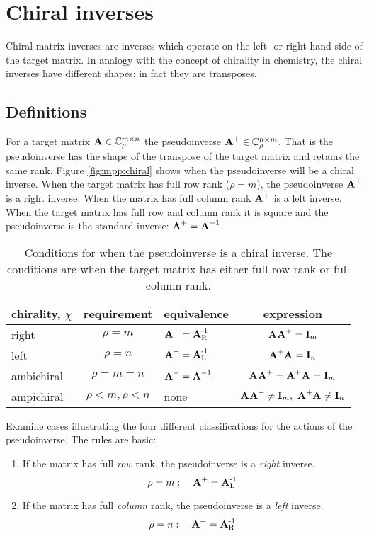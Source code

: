 \section{Chiral inverses}
\label{sec:chiral}
Chiral matrix inverses are inverses which operate on the left- or right-hand side of the target matrix. In analogy with the concept of chirality in chemistry, the chiral inverses have different shapes; in fact they are transposes.

\subsection{Definitions}
For a target matrix $\textbf{A}^{\mathrm{}}\in\mathbb{C}^{m \times n}_{\rho}$ the pseudoinverse $\operatorname{\textbf{A}^{\mathrm{+}}}\in\mathbb{C}^{n \times m}_{\rho}$. That is the pseudoinverse has the shape of the transpose of the target matrix and retains the same rank. Figure \eqref{fig:mpp:chiral} shows when the pseudoinverse will be a chiral inverse. When the target matrix has full row rank ($\rho=m$), the pseudoinverse $\operatorname{\textbf{A}^{\mathrm{+}}}$ is a right inverse. When the matrix has full column rank $\operatorname{\textbf{A}^{\mathrm{+}}}$ is a left inverse. When the target matrix has full row and column rank it is square and the pseudoinverse is the standard inverse: $\operatorname{\textbf{A}^{\mathrm{+}}}=\textbf{A}^{\mathrm{-1}}$.

\begin{table}[htdp]
\begin{center}
\begin{tabular}{lclc}
chirality, $\chi$ & requirement & equivalence & expression\\\hline
right & $\rho = m$ & $\operatorname{\textbf{A}^{\mathrm{+}}}=\operatorname{\textbf{A}^{\mathrm{-1}}_{\mathrm{R}}}$ & $\operatorname{\textbf{A}^{\mathrm{}}\textbf{A}^{\mathrm{+}}}=\textbf{I}_{m}$\\\hline
left  & $\rho = n$ & $\operatorname{\textbf{A}^{\mathrm{+}}}=\operatorname{\textbf{A}^{\mathrm{-1}}_{\mathrm{L}}}$ & $\operatorname{\textbf{A}^{\mathrm{+}}\textbf{A}^{\mathrm{}}}=\textbf{I}_{n}$\\\hline
ambichiral & $\rho=m=n$ & $\operatorname{\textbf{A}^{\mathrm{+}}}=\textbf{A}^{\mathrm{-1}}$ & $\operatorname{\textbf{A}^{\mathrm{}}\textbf{A}^{\mathrm{+}}}=\operatorname{\textbf{A}^{\mathrm{+}}\textbf{A}^{\mathrm{}}}=\textbf{I}_{m}$\\\hline
ampichiral & $\rho< m,\rho< n$ & \quad none & $\operatorname{\textbf{A}^{\mathrm{}}\textbf{A}^{\mathrm{+}}}\ne\textbf{I}_{m},\ \operatorname{\textbf{A}^{\mathrm{+}}\textbf{A}^{\mathrm{}}}\ne\textbf{I}_{n}$\\\hline
\end{tabular}
\end{center}
\label{fig:mpp:chiral}
\caption{Conditions for when the pseudoinverse is a chiral inverse. The conditions are when the target matrix has either full row rank or full column rank.}
\end{table}%

Examine cases illustrating the four different classifications for the actions of the pseudoinverse. The rules are basic:
\begin{enumerate}
\item If the matrix has full \textit{row} rank, the pseudoinverse is a \textit{right} inverse.
\begin{equation}
  \rho = m: \quad \operatorname{\textbf{A}^{\mathrm{+}}} = \operatorname{\textbf{A}^{\mathrm{-1}}_{\mathrm{L}}}
\end{equation}
\item If the matrix has full \textit{column} rank, the pseudoinverse is a \textit{left} inverse.
\begin{equation}
  \rho = n: \quad \operatorname{\textbf{A}^{\mathrm{+}}} = \operatorname{\textbf{A}^{\mathrm{-1}}_{\mathrm{R}}}
\end{equation}
\end{enumerate}

